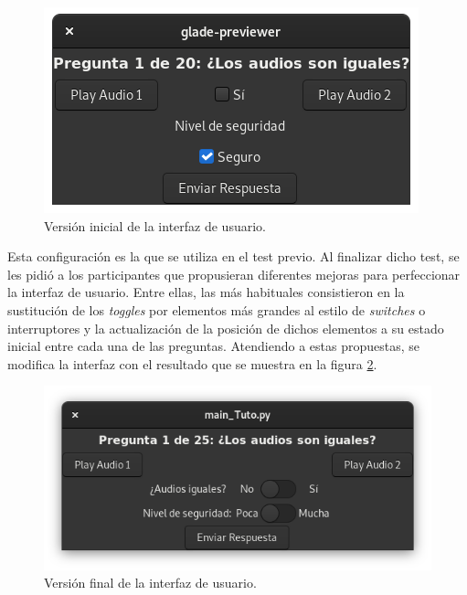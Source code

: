 \documentclass[11pt,a4paper,twoside]{book}
\begin{document}
            \begin{figure}[H]
                \begin{center}
                    \includegraphics[scale=.6]{../imagenes/uiIni.png}
                    \caption{Versión inicial de la interfaz de usuario.}
                    \label{fig:uiIni}
                \end{center}
            \end{figure}
            
            Esta configuración es la que se utiliza en el test previo. Al finalizar dicho test, se les pidió a los participantes que propusieran diferentes mejoras para perfeccionar la interfaz de usuario. Entre ellas, las más habituales consistieron en la sustitución de los \textit{toggles} por elementos más grandes al estilo de \textit{switches} o interruptores y la actualización de la posición de dichos elementos a su estado inicial entre cada una de las preguntas.
            Atendiendo a estas propuestas, se modifica la interfaz con el resultado que se muestra en la figura \ref{fig:uiFin}.
            
            \begin{figure}
                \begin{center}
                    \includegraphics[scale=.6]{../imagenes/interFin.png}
                    \caption{Versión final de la interfaz de usuario.}
                    \label{fig:uiFin}
                \end{center}
            \end{figure}
            
\end{document}
